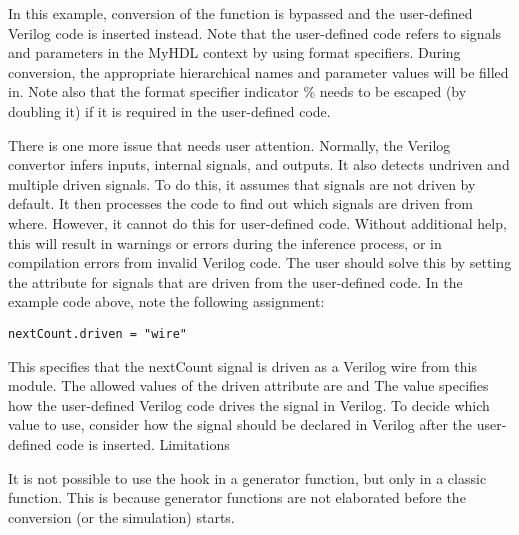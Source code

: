 In this example, conversion of the  function is bypassed and
the user-defined Verilog code is inserted instead. Note that the
user-defined code refers to signals and parameters in the MyHDL
context by using format specifiers. During conversion, the appropriate
hierarchical names and parameter values will be filled in. Note also
that the format specifier indicator \% needs to be escaped (by doubling
it) if it is required in the user-defined code.

There is one more issue that needs user attention. Normally, the
Verilog convertor infers inputs, internal signals, and outputs. It
also detects undriven and multiple driven signals. To do this, it
assumes that signals are not driven by default. It then processes the
code to find out which signals are driven from where. However, it
cannot do this for user-defined code. Without additional help, this
will result in warnings or errors during the inference process, or in
compilation errors from invalid Verilog code. The user should solve
this by setting the  attribute for signals that are driven from
the user-defined code. In the example code above, note the following
assignment:

\begin{verbatim}
nextCount.driven = "wire"
\end{verbatim}

This specifies that the nextCount signal is driven as a Verilog wire
from this module. The allowed values of the driven attribute are
 and  The value specifies how the
user-defined Verilog code drives the signal in Verilog. To decide
which value to use, consider how the signal should be declared in
Verilog after the user-defined code is inserted.  Limitations

It is not possible to use the  hook in a generator
function, but only in a classic function. This is because
generator functions are not elaborated before the conversion
(or the simulation) starts.

